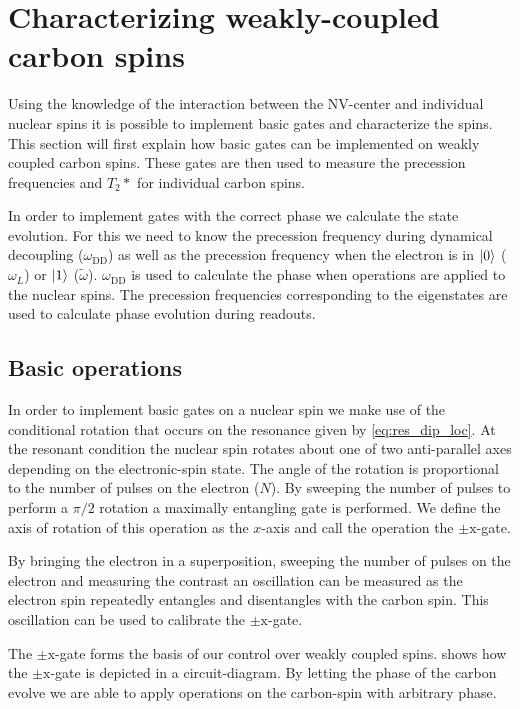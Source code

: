 \section{Characterizing weakly-coupled carbon spins}
Using the knowledge of the interaction between the NV-center and individual nuclear spins it is possible to implement basic gates and characterize the spins.
This section will first explain how basic gates can be implemented on weakly coupled carbon spins.
These gates are then used to measure the precession frequencies and $T_2*$ for individual carbon spins.

In order to implement gates with the correct phase we calculate the state evolution.
For this we need to know the precession frequency during dynamical decoupling ($\omega_{\mathrm{DD}}$) as well as the precession frequency when the electron is in ${\left\vert{0}\right\rangle}$ ($\omega_L$) or ${\left\vert{1}\right\rangle}$ ($\tilde \omega$).
$\omega_{\mathrm{DD}}$ is used to calculate the phase when operations are applied to the nuclear spins.
The precession frequencies corresponding to the eigenstates are used to calculate phase evolution during readouts.

\subsection{Basic operations}
In order to implement basic gates on a nuclear spin we make use of the conditional rotation that occurs on the resonance given by \cref{eq:res_dip_loc}.
At the resonant condition the nuclear spin rotates about one of two anti-parallel axes depending on the electronic-spin state.
The angle of the rotation is proportional to the number of pulses on the electron ($N$).
By sweeping the number of pulses to perform a $\pi/2$ rotation a maximally entangling gate is performed.
We define the axis of rotation of this operation as the $x$-axis and call the operation the $\pm \mathrm{x}$-gate.

By bringing the electron in a superposition, sweeping the number of pulses on the electron and measuring the contrast an oscillation can be measured as the electron spin repeatedly entangles and disentangles with the carbon spin.
This oscillation can be used to calibrate the $\pm \mathrm{x}$-gate.

The $\pm\mathrm{x}$-gate forms the basis of our control over weakly coupled spins.
 shows how the $\pm \mathrm{x}$-gate is depicted in a circuit-diagram.
By letting the phase of the carbon evolve we are able to apply operations on the carbon-spin with arbitrary phase.

